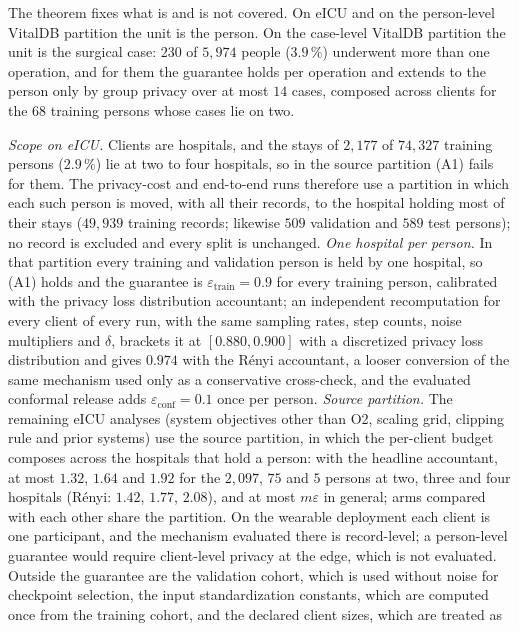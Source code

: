 The theorem fixes what is and is not covered. On eICU and on the
person-level VitalDB partition the unit is the person. On the case-level
VitalDB partition the unit is the surgical case: $230$ of $5{,}974$ people
($3.9\,\%$) underwent more than one operation, and for them the guarantee
holds per operation and extends to the person only by group privacy over at
most $14$ cases, composed across clients for the $68$ training persons whose
cases lie on two.

\emph{Scope on eICU.} Clients are hospitals, and the stays of $2{,}177$ of $74{,}327$ training persons ($2.9\,\%$) lie at two to four hospitals, so in the source partition (A1) fails for them. The privacy-cost and end-to-end runs therefore use a partition in which each such person is moved, with all their records, to the hospital holding most of their stays ($49{,}939$ training records; likewise $509$ validation and $589$ test persons); no record is excluded and every split is unchanged. \emph{One hospital per person.} In that partition every training and validation person is held by one hospital, so (A1) holds and the guarantee is $\varepsilon_{\mathrm{train}} = 0.9$ for every training person, calibrated with the privacy loss distribution accountant; an independent recomputation for every client of every run, with the same sampling rates, step counts, noise multipliers and $\delta$, brackets it at $[0.880, 0.900]$ with a discretized privacy loss distribution and gives $0.974$ with the R\'enyi accountant, a looser conversion of the same mechanism used only as a conservative cross-check, and the evaluated conformal release adds $\varepsilon_{\mathrm{conf}} = 0.1$ once per person. \emph{Source partition.} The remaining eICU analyses (system objectives other than O2, scaling grid, clipping rule and prior systems) use the source partition, in which the per-client budget composes across the hospitals that hold a person: with the headline accountant, at most $1.32$, $1.64$ and $1.92$ for the $2{,}097$, $75$ and $5$ persons at two, three and four hospitals (R\'enyi: $1.42$, $1.77$, $2.08$), and at most $m\varepsilon$ in general; arms compared with each other share the partition. On the wearable deployment each client is one participant, and the
mechanism evaluated there is record-level; a person-level guarantee would
require client-level privacy at the edge, which is not evaluated. Outside the
guarantee are the validation cohort, which is used without noise for checkpoint
selection, the input standardization constants, which are computed once from
the training cohort, and the declared client sizes, which are treated as
